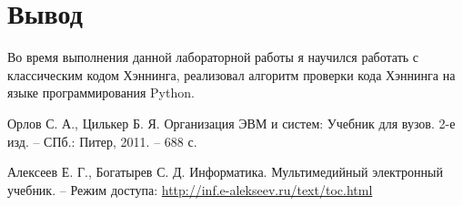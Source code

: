 \section{Вывод}
Во время выполнения данной лабораторной работы я научился работать с классическим
кодом Хэннинга, реализовал алгоритм проверки кода Хэннинга на языке программирования Python.

\clearpage
{}

\begin{thebibliography}{9}
\bibitem{} Орлов С. А., Цилькер Б. Я. Организация ЭВМ и систем: Учебник для вузов. 2-е изд. -- СПб.: Питер, 2011. -- 688 с.

\bibitem{} Алексеев Е. Г., Богатырев С. Д. Информатика. Мультимедийный электронный учебник. – Режим доступа: \url{http://inf.e-alekseev.ru/text/toc.html}

\end{thebibliography}